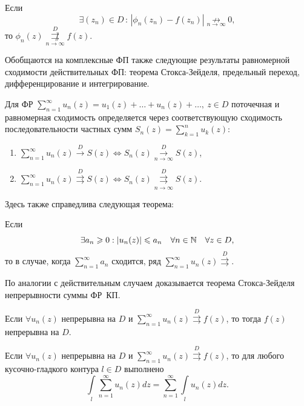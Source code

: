 \documentclass[../../main.tex]{subfiles}
\begin{document}
\begin{thm}
	Если
	\[ \exists (z_n) \in D\, :\, |\phi_n(z_n) - f(z_n)| \underset{n \to 
	\infty}{\not \rightarrow} 0, \]
	то
	$ \phi_n(z) \overset{D}{\underset{n \to \infty}{\not \rightrightarrows}} 
	f(z) $.
\end{thm}

Обобщаются на комплексные ФП также следующие результаты равномерной 
сходимости действительных ФП: теорема Стокса-Зейделя, предельный переход, 
дифференцирование и интегрирование.

Для ФР $ \sum\limits_{n = 1}^{\infty} u_n(z) = u_1(z) + \ldots + u_n(z) + 
\dots,\ z \in D $
поточечная и равномерная сходимость определяется через соответствующую 
сходимость последовательности частных сумм $ S_n(z) = \sum\limits_{k = 1}^{n} 
u_k(z): $

\begin{enumerate}
	\item $ \sum\limits_{n = 1}^{\infty} u_n(z) \overset{D}{\longrightarrow} S(z) 
	\iff S_n(z) \overset{D}{\underset{n \to \infty}\longrightarrow} S(z) $,
	
	\item $ \sum\limits_{n = 1}^{\infty} u_n(z) \overset{D}\rightrightarrows S(z) 
	\iff S_n(z) \overset{D}{\underset{n \to \infty}\rightrightarrows} S(z) $.
\end{enumerate}

Здесь также справедлива следующая теорема:

\begin{thm}
	Если
	\[ \exists a_n \geqslant 0 : |u_n(z)| \leqslant a_n\quad \forall n \in \mathbb{N} \quad \forall 
	z \in D, \]
	то в случае, когда $ \sum\limits_{n = 1}^{\infty} a_n $ сходится, ряд $ 
	\sum\limits_{n = 1}^{\infty} u_n(z) \overset{D}\rightrightarrows $.
\end{thm}

По аналогии с действительным случаем доказывается теорема Стокса-Зейделя 
непрерывности суммы ФР~КП.

\begin{thm}
Если $ \forall u_n (z) $ непрерывна на $ D $ и $ \sum\limits_{n = 
1}^{\infty} u_n(z) \overset{D}\rightrightarrows f(z) $, то тогда $ f(z) $ 
непрерывна на $ D $.
\end{thm}

\begin{thm}
Если $ \forall u_n (z) $ непрерывна на $ D $ и $ \sum\limits_{n = 
1}^{\infty} u_n(z) \overset{D}\rightrightarrows f(z) $, то для любого 
кусочно-гладкого контура $ l \in D $ выполнено
\[ \int\limits_l \sum\limits_{n = 1}^{\infty} u_n(z) dz = \sum\limits_{n = 
1}^{\infty} \int\limits_l  u_n(z) dz. \]
\end{thm}
\end{document}
